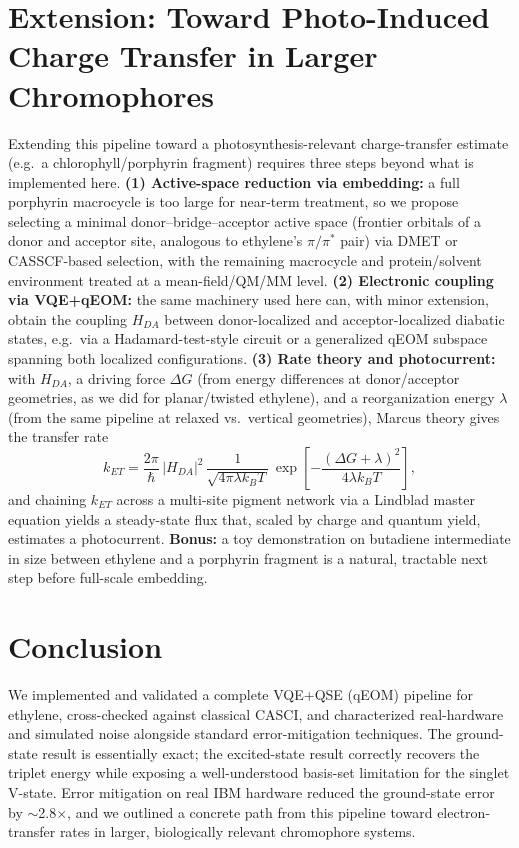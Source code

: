 \documentclass[10pt]{article}
\begin{document}
\section{Extension: Toward Photo-Induced Charge Transfer in Larger Chromophores}
Extending this pipeline toward a photosynthesis-relevant charge-transfer
estimate (e.g.\ a chlorophyll/porphyrin fragment) requires three steps beyond
what is implemented here. \textbf{(1) Active-space reduction via embedding:}
a full porphyrin macrocycle is too large for near-term treatment, so we
propose selecting a minimal donor--bridge--acceptor active space (frontier
orbitals of a donor and acceptor site, analogous to ethylene's $\pi/\pi^*$
pair) via DMET or CASSCF-based selection, with the remaining macrocycle and
protein/solvent environment treated at a mean-field/QM/MM level.
\textbf{(2) Electronic coupling via VQE+qEOM:} the same machinery used here
can, with minor extension, obtain the coupling $H_{DA}$ between
donor-localized and acceptor-localized diabatic states, e.g.\ via a
Hadamard-test-style circuit or a generalized qEOM subspace spanning both
localized configurations. \textbf{(3) Rate theory and photocurrent:} with
$H_{DA}$, a driving force $\Delta G$ (from energy differences at donor/acceptor
geometries, as we did for planar/twisted ethylene), and a reorganization
energy $\lambda$ (from the same pipeline at relaxed vs.\ vertical geometries),
Marcus theory gives the transfer rate
\[
k_{ET} = \frac{2\pi}{\hbar}\,|H_{DA}|^2\,
\frac{1}{\sqrt{4\pi\lambda k_B T}}\,
\exp\!\left[-\frac{(\Delta G + \lambda)^2}{4\lambda k_B T}\right],
\]
and chaining $k_{ET}$ across a multi-site pigment network via a Lindblad
master equation yields a steady-state flux that, scaled by charge and
quantum yield, estimates a photocurrent. \textbf{Bonus:} a toy demonstration
on butadiene intermediate in size between ethylene and a porphyrin fragment is a natural, tractable next step before full-scale embedding.

\section{Conclusion}
We implemented and validated a complete VQE+QSE (qEOM) pipeline for ethylene,
cross-checked against classical CASCI, and characterized real-hardware and
simulated noise alongside standard error-mitigation techniques. The
ground-state result is essentially exact; the excited-state result correctly
recovers the triplet energy while exposing a well-understood basis-set
limitation for the singlet V-state. Error mitigation on real IBM hardware
reduced the ground-state error by $\sim$2.8$\times$, and we outlined a
concrete path from this pipeline toward electron-transfer rates in larger,
biologically relevant chromophore systems.
\end{document}
